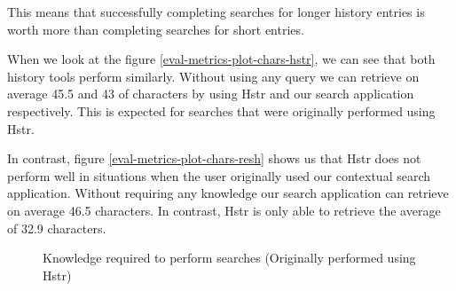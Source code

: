 This means that successfully completing searches for longer history entries is worth more than completing searches for short entries.


When we look at the figure \ref{eval-metrics-plot-chars-hstr}, we can see that both history tools perform similarly. Without using any query we can retrieve on average 45.5 and 43 of characters by using Hstr and our search application respectively. This is expected for searches that were originally performed using Hstr.

In contrast, figure \ref{eval-metrics-plot-chars-resh} shows us that Hstr does not perform well in situations when the user originally used our contextual search application. Without requiring any knowledge our search application can retrieve on average 46.5 characters. In contrast, Hstr is only able to retrieve the average of 32.9 characters.


\begin{figure}[h!]
\centering
{}
\caption{Knowledge required to perform searches (Originally performed using Hstr)}
\label{eval-metrics-plot-cmds-hstr}
\end{figure}

